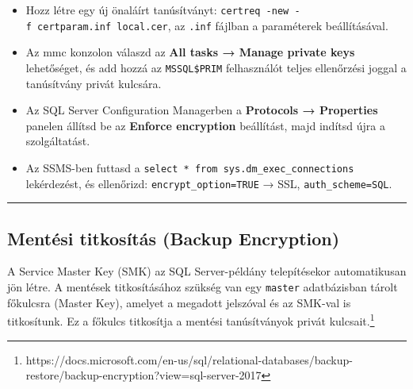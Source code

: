 \documentclass[
  magyar,
]{article}
\providecommand{\tightlist}{%
  \setlength{\itemsep}{0pt}\setlength{\parskip}{0pt}}
\begin{document}
\begin{itemize}
\tightlist
\item
  Hozz létre egy új önaláírt tanúsítványt:
  \texttt{certreq\ -new\ -f\ certparam.inf\ local.cer}, az \texttt{.inf}
  fájlban a paraméterek beállításával.
\item
  Az mmc konzolon válaszd az \textbf{All tasks → Manage private keys}
  lehetőséget, és add hozzá az \texttt{MSSQL\$PRIM} felhasználót teljes
  ellenőrzési joggal a tanúsítvány privát kulcsára.
\item
  Az SQL Server Configuration Managerben a \textbf{Protocols →
  Properties} panelen állítsd be az \textbf{Enforce encryption}
  beállítást, majd indítsd újra a szolgáltatást.
\item
  Az SSMS-ben futtasd a
  \texttt{select\ *\ from\ sys.dm\_exec\_connections} lekérdezést, és
  ellenőrizd: \texttt{encrypt\_option=TRUE} → SSL,
  \texttt{auth\_scheme=SQL}.
\end{itemize}

\begin{center}\rule{0.5\linewidth}{0.5pt}\end{center}

\subsection{Mentési titkosítás (Backup
Encryption)}\label{mentuxe9si-titkosuxedtuxe1s-backup-encryption}

A Service Master Key (SMK) az SQL Server-példány telepítésekor
automatikusan jön létre. A mentések titkosításához szükség van egy
\texttt{master} adatbázisban tárolt főkulcsra (Master Key), amelyet a
megadott jelszóval és az SMK-val is titkosítunk. Ez a főkulcs titkosítja
a mentési tanúsítványok privát kulcsait.\footnote{https://docs.microsoft.com/en-us/sql/relational-databases/backup-restore/backup-encryption?view=sql-server-2017}
\end{document}

